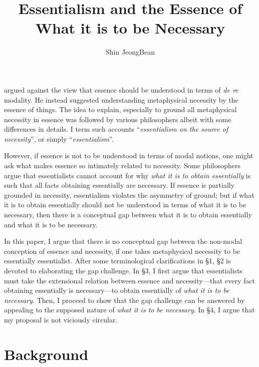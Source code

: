 \documentclass[12pt]{article}
\title{Essentialism and the Essence of What it is to be Necessary}
\author{Shin JeongBean}
\date{}
\begin{document}
\setlength{\parskip}{6pt}
\setlength{\parindent}{1em} 
\maketitle
\citet{Fine1994-FINEAM-2} argued against the view that essence should be understood in terms of \textit{de re} modality. He instead suggested understanding metaphysical necessity by the essence of things. The idea to explain, especially to ground all metaphysical necessity in essence was followed by various philosophers albeit with some differences in details. I term such accounts ``\textit{essentialism on the source of necessity}'', or simply ``\textit{essentialism}''.
\par
However, if essence is not to be understood in terms of modal notions, one might ask what makes essence so intimately related to necessity. Some philosophers argue that essentialists cannot account for why \textit{what it is to obtain essentially} is such that all facts obtaining essentially are necessary. If essence is partially grounded in necessity, essentialism violates the asymmetry of ground; but if what it is to obtain essentially should not be understood in terms of what it is to be necessary, then there is a conceptual gap between what it is to obtain essentially and what it is to be necessary. 
\par
In this paper, I argue that there is no conceptual gap between the non-modal conception of essence and necessity, if one takes metaphysical necessity to be essentially essentialist. After some terminological clarifications in \S 1, \S 2 is devoted to elaborating the gap challenge. In \S 3, I first argue that essentialists must take the extensional relation between essence and necessity---that every fact obtaining essentially is necessary---to obtain essentially of \textit{what it is to be necessary}. Then, I proceed to show that the gap challenge can be answered by appealing to the supposed nature of \textit{what it is to be necessary}. In \S 4, I argue that my proposal is not viciously circular. 
\section{Background}
\end{document}

